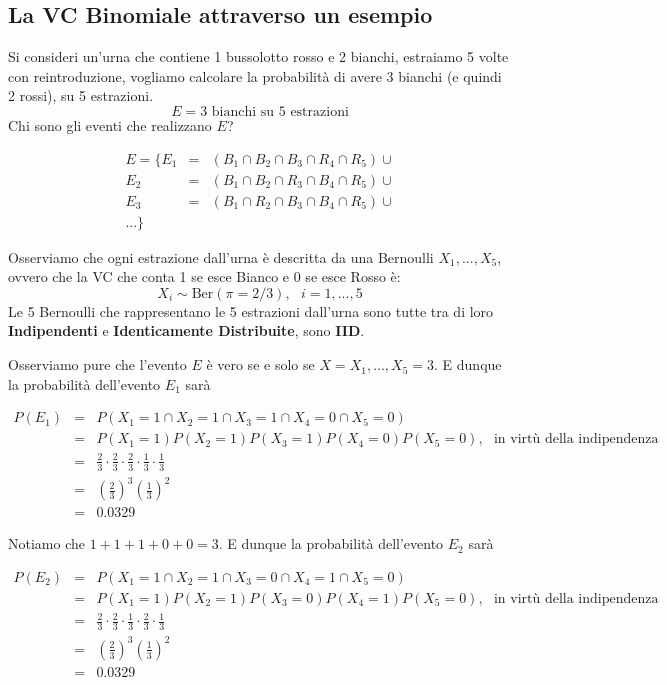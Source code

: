 \documentclass[
  11pt,
]{book}
\theoremstyle{mytheoremstyle}
\theoremstyle{mydefstyle}
\begin{document}
\subsection{La VC Binomiale attraverso un esempio}\label{la-vc-binomiale-attraverso-un-esempio}

Si consideri un'urna che contiene 1 bussolotto rosso e 2 bianchi, estraiamo 5 volte
con reintroduzione, vogliamo calcolare la probabilità di avere 3 bianchi (e quindi 2 rossi),
su 5 estrazioni.
\[
E =\text{3 bianchi su 5 estrazioni}
\]
Chi sono gli eventi che realizzano \(E\)?

\begin{eqnarray*}
E =\{E_1 &=&(B_1\cap B_2\cap B_3\cap R_4\cap R_5)\cup\\
E_2 &=&(B_1\cap B_2\cap R_3\cap B_4\cap R_5)\cup\\
E_3 &=&(B_1\cap R_2\cap B_3\cap B_4\cap R_5)\cup\\
...\}
\end{eqnarray*}

Osserviamo che ogni estrazione dall'urna è descritta da una Bernoulli \(X_1,...,X_{5}\), ovvero
che la VC che conta 1 se esce Bianco e 0 se esce Rosso è:
\[
X_i\sim\text{Ber}(\pi=2/3),~~~ i=1,...,5
\]
Le 5 Bernoulli che rappresentano le 5 estrazioni dall'urna sono tutte tra di loro \textbf{Indipendenti}
e \textbf{Identicamente Distribuite}, sono \textbf{IID}.

Osserviamo pure che l'evento \(E\) è vero se e solo se \(X=X_1,...,X_{5}=3\).
E dunque la probabilità dell'evento \(E_1\) sarà

\begin{eqnarray*}
P(E_1)&=&P(X_1=1\cap  X_2=1\cap  X_3=1\cap  X_4 =0\cap  X_5=0)\\
      &=&P(X_1=1)P(X_2=1)P(X_3=1)P(X_4=0)P(X_5=0),~~~\text{in virtù della indipendenza}\\
      &=&\frac2 3\cdot\frac2 3\cdot\frac2 3\cdot \frac 1 3 \cdot \frac 1 3\\
      &=&\left(\frac 2 3\right)^3\left(\frac 1 3\right)^2\\
      &=& 0.0329
\end{eqnarray*}

Notiamo che \(1+1+1+0+0=3\).
E dunque la probabilità dell'evento \(E_2\) sarà

\begin{eqnarray*}
P(E_2)&=&P(X_1=1\cap  X_2=1\cap  X_3=0\cap  X_4 =1\cap  X_5=0)\\
      &=&P(X_1=1)P(X_2=1)P(X_3=0)P(X_4=1)P(X_5=0),~~~\text{in virtù della indipendenza}\\
      &=&\frac2 3\cdot\frac2 3\cdot\frac1 3\cdot \frac 2 3 \cdot \frac 1 3\\
      &=&\left(\frac 2 3\right)^3\left(\frac 1 3\right)^2\\
      &=& 0.0329
\end{eqnarray*}
\end{document}
